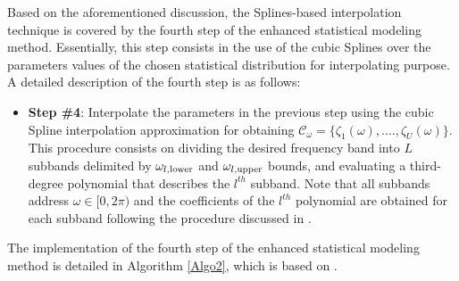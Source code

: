 Based on the aforementioned discussion, the Splines-based interpolation technique is covered by the fourth step of the enhanced statistical modeling method. Essentially, this step consists in the use of the cubic Splines over the parameters values of the chosen statistical distribution for interpolating purpose. A detailed description of the fourth step is as follows:

\begin{itemize}
	\item \textbf{Step \#4}: Interpolate the parameters in the previous step using the cubic Spline interpolation approximation for obtaining $\mathcal{C}_{\omega} = \{ \zeta_{1}(\omega), ...., \zeta_{U} (\omega)\}$. This procedure consists on dividing the desired frequency band into $L$ subbands delimited by $\omega_{l,\textnormal{lower}}$ and $\omega_{l,\textnormal{upper}}$ bounds, and evaluating a third-degree polynomial that describes the $l^{th}$ subband. Note that all subbands address $\omega \in [0,2\pi)$ and the coefficients of the $l^{th}$ polynomial are obtained for each subband following the procedure discussed in \cite{ENA,CS1}.  
\end{itemize}

The implementation of the fourth step of the enhanced statistical modeling method is detailed in Algorithm \ref{Algo2}, which is based on \cite{ENA,CS1}.

